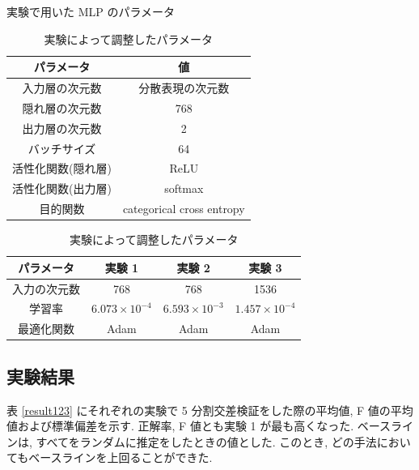 \documentclass[twocolumn]{jarticle}     %
\begin{document}
\begin{table}[t] %
	\begin{center}
		\caption{実験で用いた MLP のパラメータ}
		\label{mlph}
		\small
		\begin{tabular}{|c|c|} \hline
			パラメータ			& 値						\\ \hline \hline
			入力層の次元数			& 分散表現の次元数 \\ \hline
			隠れ層の次元数      	& 768				\\ \hline
			出力層の次元数			& 2 						\\ \hline
			バッチサイズ			& 64 						\\ \hline
			活性化関数(隠れ層)		& ReLU 					\\ \hline
			活性化関数(出力層)		& softmax 				\\ \hline
			目的関数				& categorical cross entropy 	\\ \hline
		\end{tabular}
	\end{center}
	\begin{center}
		\caption{実験によって調整したパラメータ}
		\label{optu1}
		\small
		\begin{tabular}{|c|c|c|c|} \hline
            パラメータ			 & 実験 1 & 実験 2 & 実験 3  \\ \hline \hline
            入力の次元数    & 768 & 768 & 1536  \\ \hline
			学習率				& $6.073 \times 10^{-4}$ & $6.593 \times 10^{-3}$& $1.457 \times 10^{-4}$   \\ \hline
			最適化関数			& Adam & Adam & Adam\\ \hline
		\end{tabular}
	\end{center}

\end{table}

\subsection{実験結果}
表 \ref{result123} にそれぞれの実験で 5 分割交差検証をした際の平均値, F 値の平均値および標準偏差を示す.
正解率, F 値とも実験 1 が最も高くなった.
ベースラインは, すべてをランダムに推定をしたときの値とした.
このとき, どの手法においてもベースラインを上回ることができた.
\end{document}
